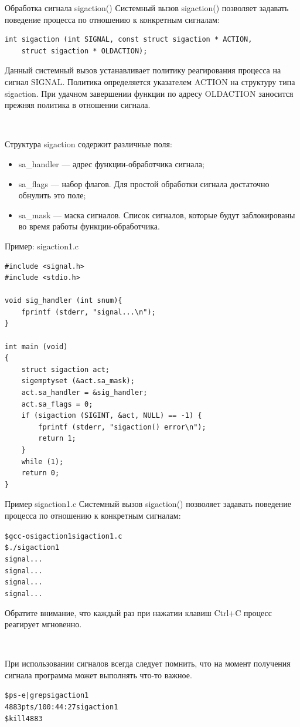 \documentclass[xcolor=table]{beamer}
\begin{document}
\begin{frame}[fragile]{Обработка сигнала sigaction()}
	Системный вызов sigaction() позволяет задавать поведение процесса по отношению к конкретным сигналам:
	\begin{verbatim}
int sigaction (int SIGNAL, const struct sigaction * ACTION, 
    struct sigaction * OLDACTION);
	\end{verbatim}
	Данный системный вызов устанавливает политику реагирования процесса на сигнал SIGNAL. Политика определяется указателем ACTION на структуру типа sigaction. При удачном завершении функции по адресу OLDACTION заносится прежняя политика в отношении сигнала. 

~

	Структура sigaction содержит различные поля:
	\begin{itemize}
		\item sa\_handler — адрес функции-обработчика сигнала; 
		\item sa\_flags — набор флагов. Для простой обработки сигнала достаточно обнулить это поле;
		\item sa\_mask — маска сигналов. Список сигналов, которые будут заблокированы во время работы функции-обработчика. 
	\end{itemize}
\end{frame}

\begin{frame}[fragile]{Пример: sigaction1.c}
	\linespread{0.8}
	\begin{verbatim}
#include <signal.h>
#include <stdio.h>

void sig_handler (int snum){
	fprintf (stderr, "signal...\n");
}

int main (void)
{
	struct sigaction act;
	sigemptyset (&act.sa_mask);
	act.sa_handler = &sig_handler;
	act.sa_flags = 0;
	if (sigaction (SIGINT, &act, NULL) == -1) {
		fprintf (stderr, "sigaction() error\n");
		return 1;
	}
	while (1);
	return 0;
}
	\end{verbatim}
\end{frame}

\begin{frame}[fragile]{Пример sigaction1.c}
	Системный вызов sigaction() позволяет задавать поведение процесса по отношению к конкретным сигналам:
\begin{alltt}
\$ gcc -o sigaction1 sigaction1.c
\$ ./sigaction1
signal...
signal...
signal...
signal...
\end{alltt}
	Обратите внимание, что каждый раз при нажатии клавиш Ctrl+C процесс реагирует мгновенно. 

~

	При использовании сигналов всегда следует помнить, что на момент получения сигнала программа может выполнять что-то важное.
	\begin{alltt}
\$ ps -e | grep sigaction1
4883 pts/1 00:44:27 sigaction1
\$ kill 4883
	\end{alltt}
\end{frame}
\end{document}
